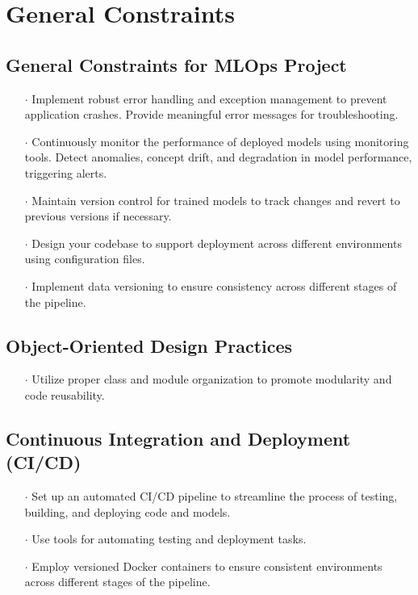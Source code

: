 \documentclass{report}
\begin{document}
\section{General Constraints}
\subsection{General Constraints for MLOps Project}

\begin{itemize}
    \item[$\cdot$] Implement robust error handling and exception management to prevent application crashes. Provide meaningful error messages for troubleshooting.
    \item[$\cdot$] Continuously monitor the performance of deployed models using monitoring tools. Detect anomalies, concept drift, and degradation in model performance, triggering alerts.
    \item[$\cdot$] Maintain version control for trained models to track changes and revert to previous versions if necessary.
    \item[$\cdot$] Design your codebase to support deployment across different environments using configuration files.
    \item[$\cdot$] Implement data versioning to ensure consistency across different stages of the pipeline.
\end{itemize}

\subsection{Object-Oriented Design Practices}

\begin{itemize}
    \item[$\cdot$] Utilize proper class and module organization to promote modularity and code reusability.
\end{itemize}

\subsection{Continuous Integration and Deployment (CI/CD)}

\begin{itemize}
    \item[$\cdot$] Set up an automated CI/CD pipeline to streamline the process of testing, building, and deploying code and models.
    \item[$\cdot$] Use tools for automating testing and deployment tasks.
    \item[$\cdot$] Employ versioned Docker containers to ensure consistent environments across different stages of the pipeline.
\end{itemize}
\end{document}
